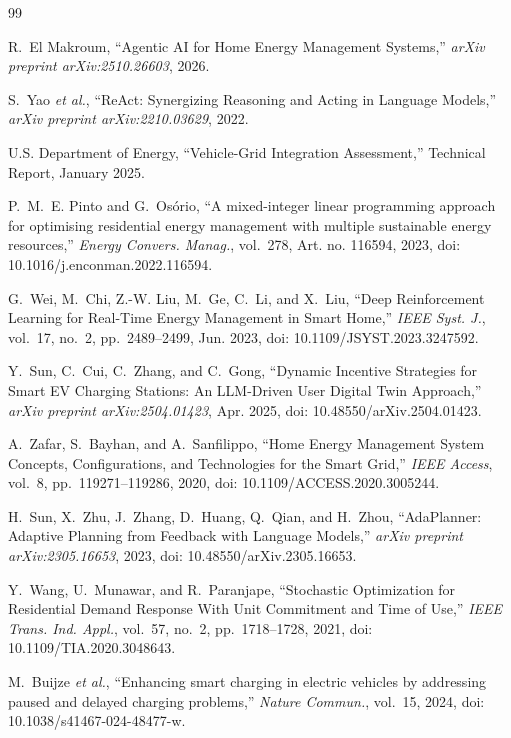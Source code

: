 \documentclass[conference]{IEEEtran}
\begin{document}

\begin{thebibliography}{99}

R.~El Makroum,
``Agentic AI for Home Energy Management Systems,''
\textit{arXiv preprint arXiv:2510.26603}, 2026.

S.~Yao \textit{et al.},
``ReAct: Synergizing Reasoning and Acting in Language Models,''
\textit{arXiv preprint arXiv:2210.03629}, 2022.

U.S. Department of Energy,
``Vehicle-Grid Integration Assessment,''
Technical Report, January 2025.

P.~M.~E. Pinto and G.~Os\'{o}rio,
``A mixed-integer linear programming approach for optimising residential
energy management with multiple sustainable energy resources,''
\textit{Energy Convers. Manag.}, vol.~278, Art. no. 116594, 2023,
doi: 10.1016/j.enconman.2022.116594.

G.~Wei, M.~Chi, Z.-W. Liu, M.~Ge, C.~Li, and X.~Liu,
``Deep Reinforcement Learning for Real-Time Energy Management in Smart Home,''
\textit{IEEE Syst. J.}, vol.~17, no.~2, pp.~2489--2499, Jun. 2023,
doi: 10.1109/JSYST.2023.3247592.

Y.~Sun, C.~Cui, C.~Zhang, and C.~Gong,
``Dynamic Incentive Strategies for Smart EV Charging Stations:
An LLM-Driven User Digital Twin Approach,''
\textit{arXiv preprint arXiv:2504.01423}, Apr. 2025,
doi: 10.48550/arXiv.2504.01423.

A.~Zafar, S.~Bayhan, and A.~Sanfilippo,
``Home Energy Management System Concepts, Configurations, and Technologies
for the Smart Grid,''
\textit{IEEE Access}, vol.~8, pp.~119271--119286, 2020,
doi: 10.1109/ACCESS.2020.3005244.

H.~Sun, X.~Zhu, J.~Zhang, D.~Huang, Q.~Qian, and H.~Zhou,
``AdaPlanner: Adaptive Planning from Feedback with Language Models,''
\textit{arXiv preprint arXiv:2305.16653}, 2023,
doi: 10.48550/arXiv.2305.16653.

Y.~Wang, U.~Munawar, and R.~Paranjape,
``Stochastic Optimization for Residential Demand Response With Unit
Commitment and Time of Use,''
\textit{IEEE Trans. Ind. Appl.}, vol.~57, no.~2, pp.~1718--1728, 2021,
doi: 10.1109/TIA.2020.3048643.

M.~Buijze \textit{et al.},
``Enhancing smart charging in electric vehicles by addressing paused
and delayed charging problems,''
\textit{Nature Commun.}, vol.~15, 2024,
doi: 10.1038/s41467-024-48477-w.


\end{thebibliography}
\end{document}
